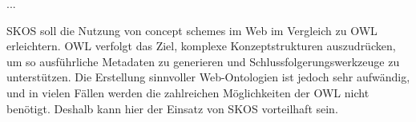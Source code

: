 	...
	
	SKOS soll die Nutzung von concept schemes im Web im Vergleich zu OWL erleichtern. OWL verfolgt das Ziel, komplexe Konzeptstrukturen auszudrücken, um so ausführliche Metadaten zu generieren und Schlussfolgerungswerkzeuge zu unterstützen. Die Erstellung sinnvoller Web-Ontologien ist jedoch sehr aufwändig, und in vielen Fällen werden die zahlreichen Möglichkeiten der OWL nicht benötigt. Deshalb kann hier der Einsatz von SKOS vorteilhaft sein.
	
	
	
	
